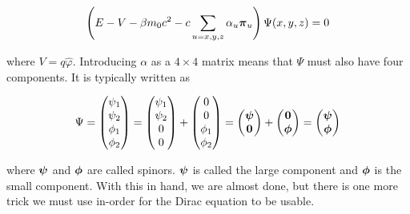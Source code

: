 \documentclass[12pt]{report}
\begin{document}
\begin{equation}
\label{eq:dirac_stat_state}
\left(E - V -\beta m_{0}c^{2} - c\sum_{u=x,y,z}\alpha_{u}{\bf{\pi}}_{u}\right)\Psi(x, y, z) = 0
\end{equation}

where $V = q\hat{\varphi}$. Introducing $\alpha$ as a $4\times4$ matrix means that $\Psi$ must also have four components. It is typically written as

\begin{equation}
\label{eq:4c_wave}
\Psi =
\begin{pmatrix}
\psi_{1}	\\
\psi_{2}	\\
\phi_{1}	\\
\phi_{2}	\\
\end{pmatrix}
=
\begin{pmatrix}
\psi_{1}	\\
\psi_{2}	\\
0	\\
0	\\
\end{pmatrix}
+
\begin{pmatrix}
0	\\
0	\\
\phi_{1}	\\
\phi_{2}	\\
\end{pmatrix}
=
\begin{pmatrix}
{\bf{\psi}}	\\
\textbf{0}	\\
\end{pmatrix}
+
\begin{pmatrix}
\textbf{0}	\\
{\bf{\phi}}	\\
\end{pmatrix}
=
\begin{pmatrix}
{\bf{\psi}}	\\
{\bf{\phi}}	\\
\end{pmatrix}
\end{equation}

where ${\bf{\psi}}$ and ${\bf{\phi}}$ are called spinors. ${\bf{\psi}}$ is called the large component and ${\bf{\phi}}$ is the small component. With this in hand, we are almost done, but there is one more trick we must use in-order for the Dirac equation to be usable. 
\end{document}
